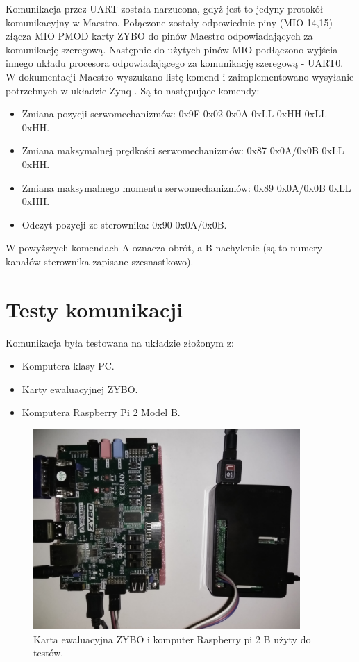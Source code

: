 Komunikacja przez UART została narzucona, gdyż jest to jedyny protokół komunikacyjny w Maestro. 
Połączone zostały odpowiednie piny (MIO 14,15) złącza MIO PMOD karty ZYBO do pinów Maestro odpowiadających za komunikację szeregową.
Następnie do użytych pinów MIO podłączono wyjścia innego układu procesora odpowiadającego za komunikację szeregową - UART0.
W dokumentacji Maestro wyszukano listę komend i zaimplementowano wysyłanie potrzebnych w układzie Zynq \cite{MM}. Są to następujące komendy:
\begin{itemize}
\item Zmiana pozycji serwomechanizmów: 0x9F 0x02 0x0A 0xLL 0xHH 0xLL 0xHH.
\item Zmiana maksymalnej prędkości serwomechanizmów: 0x87 0x0A/0x0B 0xLL 0xHH.
\item Zmiana maksymalnego momentu serwomechanizmów: 0x89 0x0A/0x0B 0xLL 0xHH.
\item Odczyt pozycji ze sterownika: 0x90 0x0A/0x0B.
\end{itemize}
W powyższych komendach A oznacza obrót, a B nachylenie (są to numery kanałów sterownika zapisane szesnastkowo).

\section{Testy komunikacji}
\label{testy_komunikacji}
Komunikacja była testowana na układzie złożonym z:
\begin{itemize}
\item Komputera klasy PC.
\item Karty ewaluacyjnej ZYBO.
\item Komputera Raspberry Pi 2 Model B.
\end{itemize}

\begin{figure}[h]
	\centering
	\includegraphics[width=4in]{raspberry.jpg}
	\caption{Karta ewaluacyjna ZYBO i komputer Raspberry pi 2 B użyty do testów.}
\end{figure}

